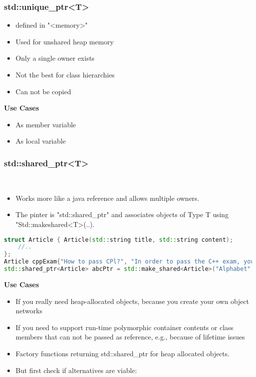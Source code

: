 \subsubsection{std::unique\_ptr<T>}
\begin{itemize}
  \itemsep -0.5em 
  \item defined in "<memory>"
  \item Used for unshared heap memory
  \item Only a single owner exists
  \item Not the best for class hierarchies
  \item Can not be copied
\end{itemize}

\textbf{Use Cases}
\begin{itemize}
  \itemsep -0.5em 
  \item As member variable
  \item As local variable
\end{itemize}


\subsubsection{std::shared\_ptr<T>}
\begin{itemize}
  \itemsep -0.5em 
  \item Works more like a java reference and allows multiple owners.
  \item The pinter is "std::shared\_ptr" and associates objects of Type T using "Std::makeshared<T>(..).
\end{itemize}

\begin{lstlisting}[language=C++]
struct Article { Article(std::string title, std::string content);
	//..
};
Article cppExam{"How to pass CPl?", "In order to pass the C++ exam, you have to..."};
std::shared_ptr<Article> abcPtr = std::make_shared<Article>("Alphabet", "ABCDEFGHIJKLMNOPQRSTUVXYZ");
\end{lstlisting}

\textbf{Use Cases}
\begin{itemize}
  \itemsep 0em 
  \item If you really need heap-allocated objects, because you create your own object networks
  \item  If you need to support run-time polymorphic container contents or class members that can not be passed as reference, e.g., because of lifetime issues 
  \item Factory functions returning std::shared\_ptr for heap allocated objects.
  \item  But first check if alternatives are viable:
\end{itemize}

